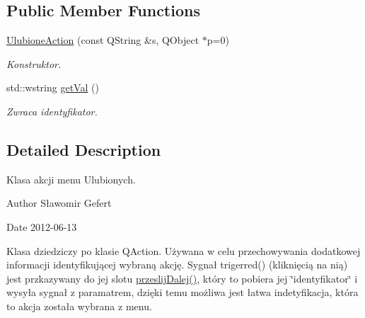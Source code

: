 \subsection*{Public Member Functions}
\begin{DoxyCompactItemize}
\item 
\hyperlink{class_ulubione_action_a5b3aeb74f280826be8487f24182cca1a}{UlubioneAction} (const QString \&s, QObject $\ast$p=0)
\begin{DoxyCompactList}\small\item\em Konstruktor. \item\end{DoxyCompactList}\item 
\hypertarget{class_ulubione_action_a37901a4bad09209e2dc3c994d1fa4a00}{
std::wstring \hyperlink{class_ulubione_action_a37901a4bad09209e2dc3c994d1fa4a00}{getVal} ()}
\label{class_ulubione_action_a37901a4bad09209e2dc3c994d1fa4a00}

\begin{DoxyCompactList}\small\item\em Zwraca identyfikator. \item\end{DoxyCompactList}\end{DoxyCompactItemize}


\subsection{Detailed Description}
Klasa akcji menu Ulubionych. \begin{DoxyAuthor}{Author}
Sławomir Gefert 
\end{DoxyAuthor}
\begin{DoxyDate}{Date}
2012-\/06-\/13
\end{DoxyDate}
Klasa dziedziczy po klasie QAction. Używana w celu przechowywania dodatkowej informacji identyfikującej wybraną akcję. Sygnał trigerred() (kliknięcią na nią) jest przkazywany do jej slotu \hyperlink{class_ulubione_action_aa41010fb7799b8962dc713542ace1a91}{przeslijDalej()}, który to pobiera jej \char`\"{}identyfikator\char`\"{} i wysyła sygnał z paramatrem, dzięki temu możliwa jest łatwa indetyfikacja, która to akcja została wybrana z menu. 

